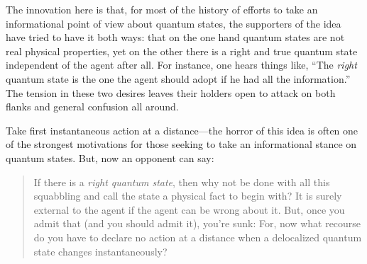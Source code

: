 \documentclass[aps,pra,superscriptaddress,10pt,tightenlines,twocolumn,nofootinbib]{revtex4}
\begin{document}
The innovation here is that, for most of the history of efforts to take an informational point of view about quantum states, the supporters of the idea have tried to have it both ways:  that on the one hand quantum states are not real physical properties, yet on the other there is a right and true quantum state independent of the agent after all. For instance, one hears things like, ``The {\it right\/} quantum state is the one the agent should adopt if he had all the information.''  The tension in these two desires leaves their holders open to attack on both flanks and general confusion all around.

Take first instantaneous action at a distance---the horror of this idea is often one of the strongest motivations for those seeking to take an informational stance on quantum states.  But, now an opponent can say:
\begin{quote}
\noindent If there is a {\it right quantum state}, then why not be done with all this squabbling and call the state a physical fact to begin with?  It is surely external to the agent if the agent can be wrong about it.  But, once you admit that (and you should admit it), you're sunk: For, now what recourse do you have to declare no action at a distance when a delocalized quantum state changes instantaneously?


\end{quote}
\end{document}
